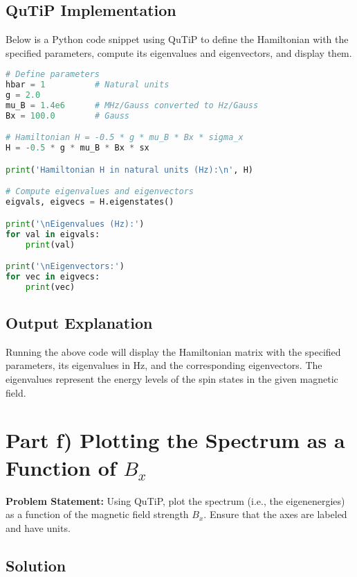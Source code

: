 \documentclass[12pt]{article}
\begin{document}
\subsection{QuTiP Implementation}

Below is a Python code snippet using QuTiP to define the Hamiltonian with the specified parameters, compute its eigenvalues and eigenvectors, and display them.

\begin{lstlisting}[language=Python, caption=Defining the Hamiltonian with Specific Parameters in QuTiP]
# Define parameters
hbar = 1          # Natural units
g = 2.0
mu_B = 1.4e6      # MHz/Gauss converted to Hz/Gauss
Bx = 100.0        # Gauss

# Hamiltonian H = -0.5 * g * mu_B * Bx * sigma_x
H = -0.5 * g * mu_B * Bx * sx

print('Hamiltonian H in natural units (Hz):\n', H)

# Compute eigenvalues and eigenvectors
eigvals, eigvecs = H.eigenstates()

print('\nEigenvalues (Hz):')
for val in eigvals:
    print(val)

print('\nEigenvectors:')
for vec in eigvecs:
    print(vec)
\end{lstlisting}

\subsection{Output Explanation}

Running the above code will display the Hamiltonian matrix with the specified parameters, its eigenvalues in Hz, and the corresponding eigenvectors. The eigenvalues represent the energy levels of the spin states in the given magnetic field.

\newpage

\section{Part f) Plotting the Spectrum as a Function of \( B_x \)}

\textbf{Problem Statement:} Using QuTiP, plot the spectrum (i.e., the eigenenergies) as a function of the magnetic field strength \( B_x \). Ensure that the axes are labeled and have units.

\subsection{Solution}
\end{document}
